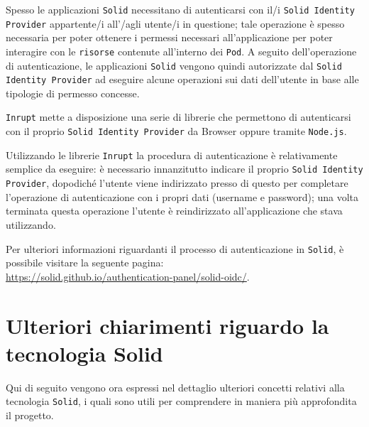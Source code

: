 Spesso le applicazioni {\tt Solid} necessitano di autenticarsi con il/i {\tt Solid Identity Provider} appartente/i all'/agli utente/i in questione; tale operazione è spesso necessaria per poter ottenere i permessi necessari all'applicazione per poter interagire con le {\tt risorse} contenute all'interno dei {\tt Pod}. A seguito dell'operazione di autenticazione, le applicazioni {\tt Solid} vengono quindi autorizzate dal {\tt Solid Identity Provider} ad eseguire alcune operazioni sui dati dell'utente in base alle tipologie di permesso concesse.

\medskip

{\tt Inrupt} mette a disposizione una serie di librerie che permettono di autenticarsi con il proprio {\tt Solid Identity Provider} da Browser oppure tramite {\tt Node.js}.

\medskip

Utilizzando le librerie {\tt Inrupt} la procedura di autenticazione è relativamente semplice da eseguire: è necessario innanzitutto indicare il proprio {\tt Solid Identity Provider}, dopodiché l'utente viene indirizzato presso di questo per completare l'operazione di autenticazione con i propri dati (username e password); una volta terminata questa operazione l'utente è reindirizzato all'applicazione che stava utilizzando.

\medskip

Per ulteriori informazioni riguardanti il processo di autenticazione in {\tt Solid}, è possibile visitare la seguente pagina:\\
\href{https://solid.github.io/authentication-panel/solid-oidc/}{https://solid.github.io/authentication-panel/solid-oidc/}.

\bigskip

\section{Ulteriori chiarimenti riguardo la tecnologia Solid}

\bigskip

Qui di seguito vengono ora espressi nel dettaglio ulteriori concetti relativi alla tecnologia {\tt Solid}, i quali sono utili per comprendere in maniera più approfondita il progetto.

\bigskip

